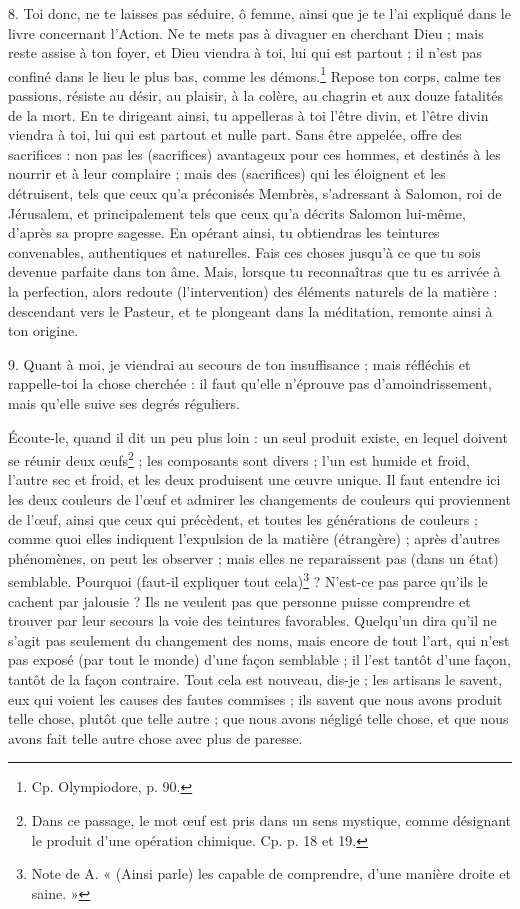 \documentclass[landscape, a4paper, 11pt, oneside, polutonikogreek, french]{article}
\begin{document}
8. Toi donc, ne te laisses pas séduire, ô femme, ainsi que je te l'ai expliqué dans le livre concernant l'Action. Ne te mets pas à divaguer en cherchant Dieu ; mais reste assise à ton foyer, et Dieu viendra à toi, lui qui est partout ; il n'est pas confiné dans le lieu le plus bas, comme les démons.\footnote{Cp. Olympiodore, p. 90.} Repose ton corps, calme tes passions, résiste au désir, au plaisir, à la colère, au chagrin et aux douze fatalités de la mort. En te dirigeant ainsi, tu appelleras à toi l'être divin, et l'être divin viendra à toi, lui qui est partout et nulle part. Sans être appelée, offre des sacrifices : non pas les (sacrifices) avantageux pour ces hommes, et destinés à les nourrir et à leur complaire ; mais des (sacrifices) qui les éloignent et les détruisent, tels que ceux qu'a préconisés Membrès, s'adressant à Salomon, roi de Jérusalem, et principalement tels que ceux qu'a décrits Salomon lui-même, d'après sa propre sagesse. En opérant ainsi, tu obtiendras les teintures convenables, authentiques et naturelles. Fais ces choses jusqu'à ce que tu sois devenue parfaite dans ton âme. Mais, lorsque tu reconnaîtras que tu es arrivée à la perfection, alors redoute (l'intervention) des éléments naturels de la matière : descendant vers le Pasteur, et te plongeant dans la méditation, remonte ainsi à ton origine.

9. Quant à moi, je viendrai au secours de ton insuffisance ; mais réfléchis et rappelle-toi la chose cherchée : il faut qu'elle n'éprouve pas d'amoindrissement, mais qu'elle suive ses degrés réguliers.

Écoute-le, quand il dit un peu plus loin : un seul produit existe, en lequel doivent se réunir deux œufs\footnote{Dans ce passage, le mot œuf est pris dans un sens mystique, comme désignant le produit d'une opération chimique. Cp. p. 18 et 19.} ; les composants sont divers ; l'un est humide et froid, l'autre sec et froid, et les deux produisent une œuvre unique. Il faut entendre ici les deux couleurs de l'œuf et admirer les changements de couleurs qui proviennent de l'œuf, ainsi que ceux qui précèdent, et toutes les générations de couleurs ; comme quoi elles indiquent l'expulsion de la matière (étrangère) ; après d'autres phénomènes, on peut les observer ; mais elles ne reparaissent pas (dans un état) semblable. Pourquoi (faut-il expliquer tout cela)\footnote{Note de A. « (Ainsi parle) les capable de comprendre, d'une manière droite et saine. »} ? N'est-ce pas parce qu'ils le cachent par jalousie ? Ils ne veulent pas que personne puisse comprendre et trouver par leur secours la voie des teintures favorables. Quelqu'un dira qu'il ne s'agit pas seulement du changement des noms, mais encore de tout l'art, qui n'est pas exposé (par tout le monde) d'une façon semblable ; il l'est tantôt d'une façon, tantôt de la façon contraire. Tout cela est nouveau, dis-je ; les artisans le savent, eux qui voient les causes des fautes commises ; ils savent que nous avons produit telle chose, plutôt que telle autre ; que nous avons négligé telle chose, et que nous avons fait telle autre chose avec plus de paresse.
\end{document}
